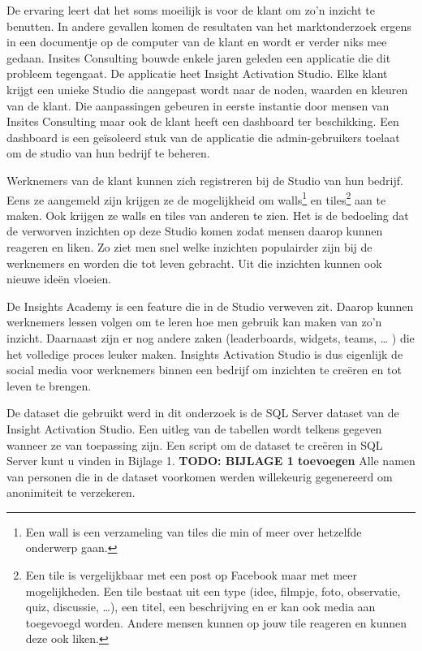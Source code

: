 De ervaring leert dat het soms moeilijk is voor de klant om zo'n inzicht te benutten. In andere gevallen komen de resultaten van het marktonderzoek ergens in een documentje op de computer van de klant en wordt er verder niks mee gedaan. Insites Consulting bouwde enkele jaren geleden een applicatie die dit probleem tegengaat. De applicatie heet Insight Activation Studio. Elke klant krijgt een unieke Studio die aangepast wordt naar de noden, waarden en kleuren van de klant. Die aanpassingen gebeuren in eerste instantie door mensen van Insites Consulting maar ook de klant heeft een dashboard ter beschikking. Een dashboard is een geïsoleerd stuk van de applicatie die admin-gebruikers toelaat om de studio van hun bedrijf te beheren.  

Werknemers van de klant kunnen zich registreren bij de Studio van hun bedrijf. Eens ze aangemeld zijn krijgen ze de mogelijkheid om walls\footnote{Een wall is een verzameling van tiles die min of meer over hetzelfde onderwerp gaan.} en tiles\footnote{Een tile is vergelijkbaar met een post op Facebook maar met meer mogelijkheden. Een tile bestaat uit een type (idee, filmpje, foto, observatie, quiz, discussie, …), een titel, een beschrijving en er kan ook media aan toegevoegd worden. Andere mensen kunnen op jouw tile reageren en kunnen deze ook liken.} aan te maken. Ook krijgen ze walls en tiles van anderen te zien. Het is de bedoeling dat de verworven inzichten op deze Studio komen zodat mensen daarop kunnen reageren en liken. Zo ziet men snel welke inzichten populairder zijn bij de werknemers en worden die tot leven gebracht. Uit die inzichten kunnen ook nieuwe ideën vloeien.

De Insights Academy is een feature die in de Studio verweven zit. Daarop kunnen werknemers lessen volgen om te leren hoe men gebruik kan maken van zo’n inzicht. Daarnaast zijn er nog andere zaken (leaderboards, widgets, teams, … ) die het volledige proces leuker maken. Insights Activation Studio is dus eigenlijk de social media voor werknemers binnen een bedrijf om inzichten te creëren en tot leven te brengen.

De dataset die gebruikt werd in dit onderzoek is de SQL Server dataset van de Insight Activation Studio. Een uitleg van de tabellen wordt telkens gegeven wanneer ze van toepassing zijn. Een script om de dataset te creëren in SQL Server kunt u vinden in Bijlage 1. \textbf{TODO: BIJLAGE 1 toevoegen} Alle namen van personen die in de dataset voorkomen werden willekeurig gegenereerd om anonimiteit te verzekeren.

